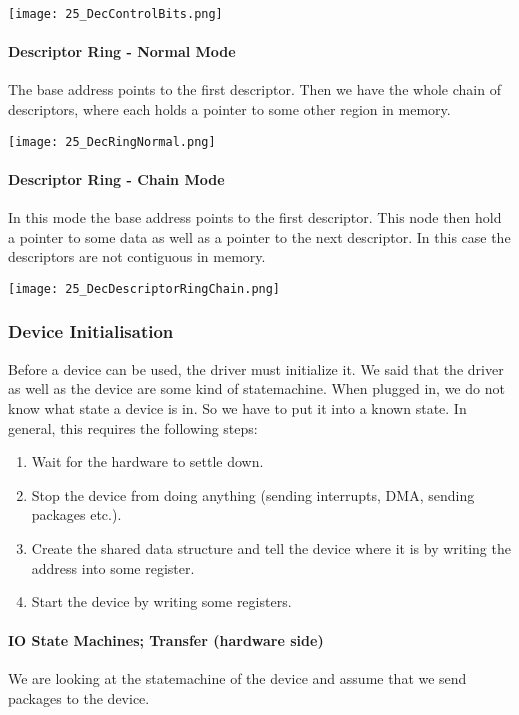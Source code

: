 \texttt{[image: 25\_DecControlBits.png]}

\paragraph{Descriptor Ring - Normal Mode}
The base address points to the first descriptor. Then we have the whole chain of descriptors, where each holds a pointer to some other region in memory.

\texttt{[image: 25\_DecRingNormal.png]}

\paragraph{Descriptor Ring - Chain Mode}
In this mode the base address points to the first descriptor. This node then hold a pointer to some data as well as a pointer to the next descriptor. In this case the descriptors are not contiguous in memory. 

\texttt{[image: 25\_DecDescriptorRingChain.png]}

\subsubsection{Device Initialisation}
Before a device can be used, the driver must initialize it. We said that the driver as well as the device are some kind of statemachine. When plugged in, we do not know what state a device is in. So we have to put it into a known state. In general, this requires the following steps:

\begin{enumerate}
    \item Wait for the hardware to settle down.
    \item Stop the device from doing anything (sending interrupts, DMA, sending packages etc.).
    \item Create the shared data structure and tell the device where it is by writing the address into some register. 
    \item Start the device by writing some registers.
\end{enumerate}

\paragraph{IO State Machines; Transfer (hardware side)}
We are looking at the statemachine of the device and assume that we send packages to the device.

